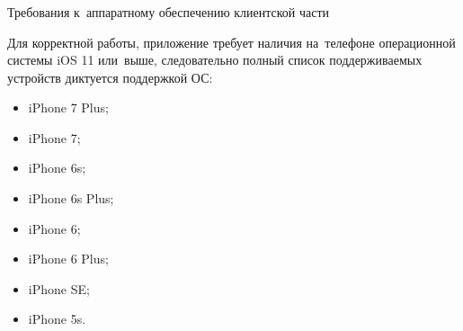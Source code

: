 \subsubsection{} Требования к~аппаратному обеспечению клиентской части
\label{sec:analysis:research:req:client_requirments}

Для корректной работы, приложение требует наличия на~телефоне операционной системы iOS 11 или~выше, следовательно полный список поддерживаемых устройств диктуется поддержкой ОС:
\begin{itemize}
	\item iPhone 7 Plus;
	\item iPhone 7;
	\item iPhone 6s;
	\item iPhone 6s Plus;
	\item iPhone 6;
	\item iPhone 6 Plus;
	\item iPhone SE;
	\item iPhone 5s.
\end{itemize}